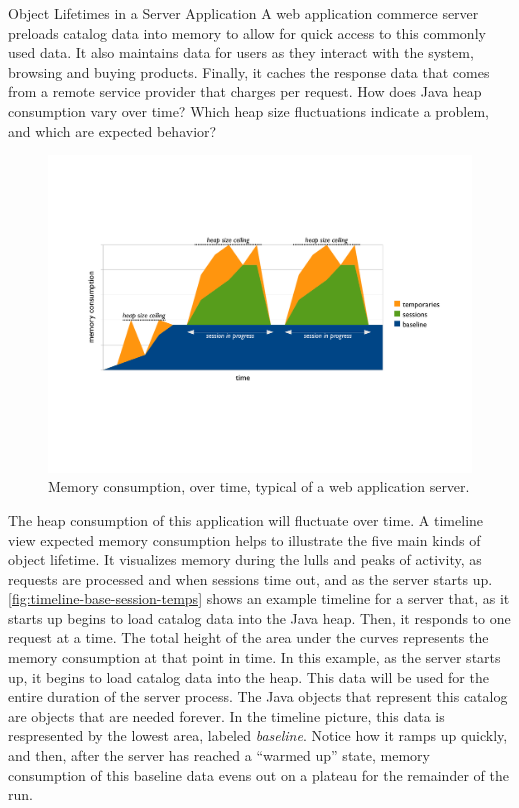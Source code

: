 \begin{example}{Object Lifetimes in a Server Application}
A web application commerce server preloads catalog data into memory to allow for
quick access to this commonly used data. It also maintains data for users as they
interact with the system, browsing and buying products. Finally, it 
caches the response data that comes from a remote service provider that charges
per request. How does Java heap consumption vary over time? Which heap size
fluctuations indicate a problem, and which are expected behavior?
\end{example}

\begin{figure}
	\centering
	\includegraphics[width=\textwidth]{part4/Figures/lifetime/timeline-base-session-temps}
	\caption{Memory consumption, over time, typical of a web application server.}
	\label{fig:timeline-base-session-temps}
\end{figure}

The heap consumption of this application will fluctuate over time. A timeline
view expected memory consumption helps to illustrate the five main kinds of
object lifetime. It visualizes memory during the lulls and peaks of activity, as
requests are processed and when sessions time out, and as the server starts up.
 \autoref{fig:timeline-base-session-temps} shows an example timeline
for a server that, as it starts up begins to load catalog data into the Java heap.
Then, it responds to one request at a time. The total height of the area under
the curves represents the memory consumption at that point in time. 
In this example, as the server starts up, it begins to load catalog data into
the heap. This data will be used for the entire duration of the server process.
The Java objects that represent this catalog are objects that are needed
forever. In the timeline picture, this data is respresented by the lowest area,
labeled \emph{baseline}. Notice how it ramps up quickly, and then, after the
server has reached a ``warmed up'' state, memory consumption of this baseline
data evens out on a plateau for the remainder of the run.

